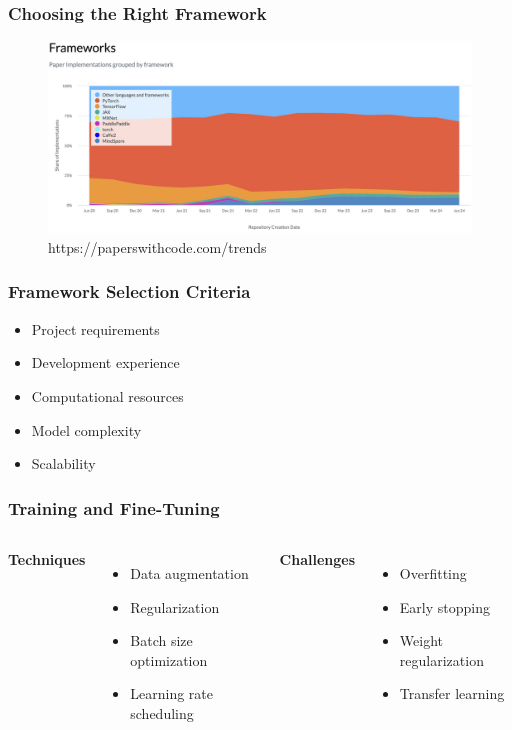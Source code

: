 \documentclass{beamer}
\begin{document}
\begin{frame}
\frametitle{Choosing the Right Framework}
\begin{figure}
    \centering
    \includegraphics[width=1\textwidth,keepaspectratio]{images/frameworks}
    \caption{https://paperswithcode.com/trends}
    \label{fig:frameworks}
\end{figure}
\end{frame}

\begin{frame}
\frametitle{Framework Selection Criteria}
\begin{itemize}
    \item Project requirements
    \item Development experience
    \item Computational resources
    \item Model complexity
    \item Scalability
\end{itemize}
\end{frame}

\begin{frame}
\frametitle{Training and Fine-Tuning}
\begin{columns}
    \textbf{Techniques}
    \begin{itemize}
        \item Data augmentation
        \item Regularization
        \item Batch size optimization
        \item Learning rate scheduling
    \end{itemize}

    \textbf{Challenges}
    \begin{itemize}
        \item Overfitting
        \item Early stopping
        \item Weight regularization
        \item Transfer learning
    \end{itemize}
\end{columns}
\end{frame}
\end{document}
